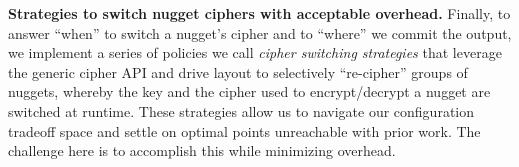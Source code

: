 \textbf{Strategies to switch nugget ciphers with acceptable overhead.} Finally,
to answer ``when'' to switch a nugget's cipher and to ``where'' we commit the
output, we implement a series of policies we call \textit{cipher switching
strategies} that leverage the generic cipher API and drive layout to selectively
``re-cipher'' groups of nuggets, whereby the key and the cipher used to
encrypt/decrypt a nugget are switched at runtime. These strategies allow us to
navigate our configuration tradeoff space and settle on optimal points
unreachable with prior work. The challenge here is to accomplish this while
minimizing overhead.


